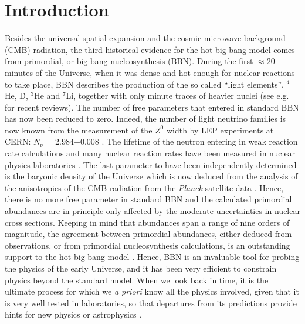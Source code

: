 \documentclass[onecolumn,float,floatfix,preprintnumbers,aps,rmp,nofootinbib,amsmath,amssymb,amsfonts,superscriptaddress,tightenlines]{revtex4}
\newcommand{\hli}{{$^4$He, D, $^3$He and $^{7}$Li}}
\begin{document}

\tableofcontents

\section{Introduction}

Besides the universal spatial expansion and the cosmic microwave
background (CMB) radiation, the third historical evidence for 
the hot big bang model comes from primordial, or big bang nucleosynthesis (BBN). During the first $\approx$20 minutes of the
Universe, when it was dense and hot enough for nuclear reactions to
take place, BBN describes the production of the so called  ``light
elements'',  \hli, together with  only minute traces of heavier
nuclei (see e.g. \citet{Oli10,Ste07,Cyb16,PDG17,CV17} for recent reviews). 
The number of free parameters that entered in standard BBN has
now been reduced to zero. Indeed, the number
of light neutrino families is now known from the measurement of the $Z^0$
width by LEP experiments at CERN: $N_\nu$ = 2.984$\pm$0.008 \cite{PDG17}.
The lifetime of the neutron entering in weak reaction rate calculations and many nuclear reaction rates have been measured in nuclear physics laboratories \cite{Coc15,Cyb16,Serpico:2004gx,Des04}.
The last parameter to have been independently determined is the baryonic density
of the Universe which is now deduced from the analysis of the anisotropies
of the CMB radiation from the {\it Planck} satellite data \cite{Planck2016}.
Hence, there is no more free parameter in standard BBN  and the calculated 
primordial abundances are in principle only affected by the moderate uncertainties in
nuclear cross sections. 
Keeping in mind that abundances span a range of nine orders of magnitude, the agreement between primordial abundances,
either deduced from observations, or from primordial
nucleosynthesis calculations, is an outstanding support to the hot big bang model \cite{Cyb16}. 
Hence, BBN is an invaluable tool for probing the physics of the early
Universe, and it has been very efficient to constrain physics beyond
the standard model. When we look back in time,
it is the ultimate process for which we {\it a priori} know all the
physics involved, given that it is very well tested in laboratories, so that departures from its predictions provide hints for new physics or astrophysics  \citep{IoccoReport,Pos10,MKK17,Nakamura2017}. 
\end{document}
